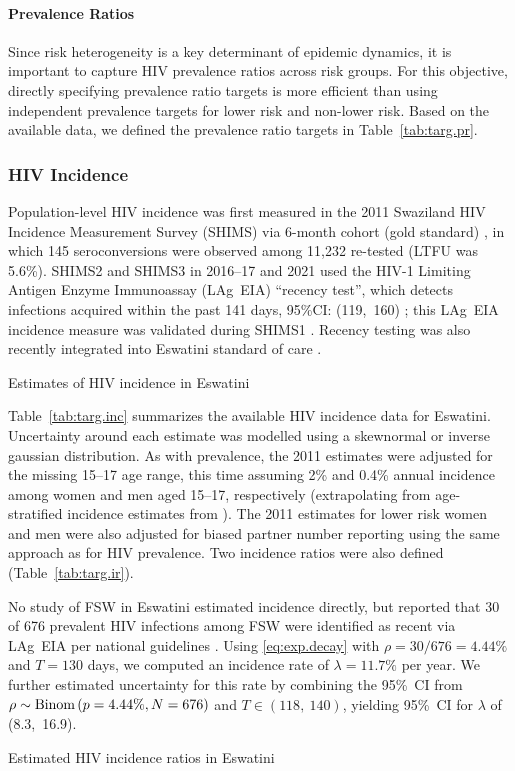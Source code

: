 \paragraph{Prevalence Ratios}
Since risk heterogeneity is a key determinant of epidemic dynamics,
it is important to capture HIV prevalence ratios across risk groups.
For this objective, directly specifying prevalence ratio targets is more efficient than
using independent prevalence targets for lower risk and non-lower risk.
Based on the available data, we defined the prevalence ratio targets in Table~\ref{tab:targ.pr}.
\subsubsection{HIV Incidence}\label{mod.cal.targ.inc}
Population-level HIV incidence was first measured in the 2011
Swaziland HIV Incidence Measurement Survey (SHIMS)
via 6-month cohort (gold standard) \cite{SHIMS1,Justman2016},
in which 145 seroconversions were observed among 11,232 re-tested (LTFU was 5.6\%).
SHIMS2 and SHIMS3 in 2016--17 and 2021 used
the HIV-1 Limiting Antigen Enzyme Immunoassay (LAg~EIA) ``recency test'',
which detects infections acquired within the past 141 days, 95\%CI: (119,~160) \cite{Duong2012};
this LAg~EIA incidence measure was validated during SHIMS1 \cite{SHIMS1}.
Recency testing was also recently integrated into Eswatini standard of care \cite{EswCOP21}.
\par
\begin{table}
  \centering
  \caption{Estimates of HIV incidence in Eswatini}
  \label{tab:targ.inc}
  
\end{table}
Table~\ref{tab:targ.inc} summarizes the available HIV incidence data for Eswatini.
Uncertainty around each estimate was modelled using a skewnormal or inverse gaussian distribution.
As with prevalence, the 2011 estimates were adjusted for the missing 15--17 age range,
this time assuming 2\% and 0.4\% annual incidence
among women and men aged 15--17, respectively
(extrapolating from age-stratified incidence estimates from \cite{Justman2016}).
The 2011 estimates for lower risk women and men were also adjusted
for biased partner number reporting using the same approach as for HIV prevalence.
Two incidence ratios were also defined (Table~\ref{tab:targ.ir}).
\par
No study of FSW in Eswatini estimated incidence directly,
but \cite{EswIBBS2022} reported that 30 of 676 prevalent HIV infections among FSW
were identified as recent via LAg~EIA per national guidelines \cite{SHIMS2,EswCOP21}.
Using \eqref{eq:exp.decay} with $\rho = 30/676 = 4.44\%$ and $T = 130$ days,
we computed an incidence rate of $\lambda = 11.7\%$ per year.
We further estimated uncertainty for this rate by combining
the 95\%~CI from $\rho \sim \textnormal{Binom}\,(p = 4.44\%, N = 676)$ and $T \in (118,~140)$,
yielding 95\%~CI for $\lambda$ of (8.3,~16.9).
\begin{table}
  \centering
  \caption{Estimated HIV incidence ratios in Eswatini}
  \label{tab:targ.ir}
  
\end{table}

